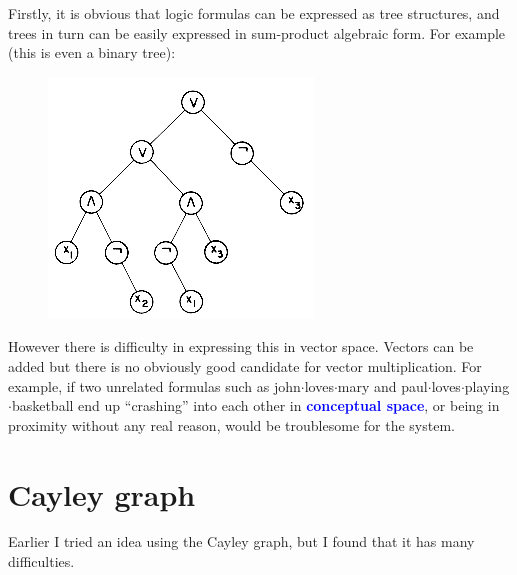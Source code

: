 \documentclass[12pt]{article}
\newcommand{\concept}[1]{\textbf{\textcolor{blue}{#1}}}
\newcommand{\formula}[1]{\textcolor{LogicColor}{#1}}
\begin{document}
Firstly, it is obvious that logic formulas can be expressed as tree structures, and trees in turn can be easily expressed in sum-product algebraic form.  For example (this is even a binary tree):
\begin{figure}[H]
\centering
\includegraphics[scale=0.5]{logic-formula-tree.jpg}
\end{figure}

However there is difficulty in expressing this in vector space.  Vectors can be added but there is no obviously good candidate for vector multiplication.  For example, if two unrelated formulas such as \formula{john$\cdot$loves$\cdot$mary} and \formula{paul$\cdot$loves$\cdot$playing$\cdot$basketball} end up ``crashing'' into each other in \concept{conceptual space}, or being in proximity without any real reason, would be troublesome for the system.

\section{Cayley graph}

Earlier I tried an idea using the Cayley graph, but I found that it has many difficulties.
\end{document}
